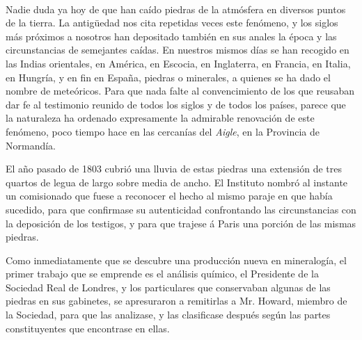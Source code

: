 \documentclass[a4paper, 12pt, oneside, spanish]{article}
\begin{document}
\setlength{\parskip}{1mm plus1mm minus1mm}
\clearpage
\large
\pagestyle{fancy}
\fancyhf{}
\cfoot{\Fontauri{\thepage}}
\paragraph{}
Nadie duda ya hoy de que han caído piedras de la atmósfera en diversos puntos de la tierra. La antigüedad nos cita repetidas veces este fenómeno, y los siglos más próximos a nosotros han depositado también en sus anales la época y las circunstancias de semejantes caídas. En nuestros mismos días se han recogido en las Indias orientales, en América, en Escocia, en Inglaterra, en Francia, en Italia, en Hungría, y en fin en España, piedras o minerales, a quienes se ha dado el nombre de meteóricos. Para que nada falte al convencimiento de los que reusaban dar fe al testimonio reunido de todos los siglos y de todos los países, parece que la naturaleza ha ordenado expresamente la admirable renovación de este fenómeno, poco tiempo hace en las cercanías del \emph{Aigle}, en la Provincia de Normandía.

El año pasado de 1803 cubrió una lluvia de estas piedras una extensión de tres quartos de legua de largo sobre media de ancho. El Instituto nombró al instante un comisionado que fuese a reconocer el hecho al mismo paraje en que había sucedido, para que confirmase su autenticidad confrontando las circunstancias con la deposición de los testigos, y para que trajese á Paris una porción de las mismas piedras.

Como inmediatamente que se descubre una producción nueva en mineralogía, el primer trabajo que se emprende es el análisis químico, el Presidente de la Sociedad Real de Londres, y los particulares que conservaban algunas de las piedras en sus gabinetes, se apresuraron a remitirlas a Mr. Howard, miembro de la Sociedad, para que las analizase, y las clasificase después según las partes constituyentes que encontrase en ellas.
\end{document}
